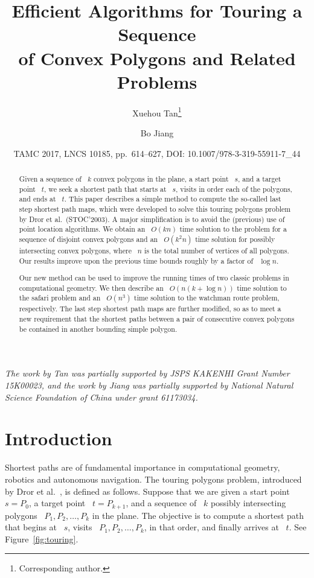 \documentclass[11pt]{article}
\title{Efficient Algorithms for Touring a Sequence\\ of Convex Polygons and Related Problems}
\author[2]{Xuehou Tan\thanks{Corresponding author.}}
\author[1]{Bo Jiang}
\affil[1]{Dalian Maritime University, Linghai Road 1, Dalian, China}
\affil[2]{Tokai University, 4-1-1 Kitakaname, Hiratsuka 259-1292, Japan \\ \texttt{tan@wing.ncc.u-tokai.ac.jp}}
\date{TAMC 2017, LNCS 10185, pp.\ 614--627, DOI: 10.1007/978-3-319-55911-7\_44}
\begin{document}
\maketitle

\begin{abstract}
Given a sequence of ~\(k\) convex polygons in the plane, a start point ~\(s\), and a target point ~\(t\), we seek a shortest path that starts at ~\(s\), visits in order each of the polygons, and ends at ~\(t\).
This paper describes a simple method to compute the so-called last step shortest path maps, which were developed to solve this touring polygons problem by Dror et al.\ (STOC'2003).
A major simplification is to avoid the (previous) use of point location algorithms.
We obtain an ~\(O(kn)\) time solution to the problem for a sequence of disjoint convex polygons and an ~\(O(k^2n)\) time solution for possibly intersecting convex polygons, where ~\(n\) is the total number of vertices of all polygons.
Our results improve upon the previous time bounds roughly by a factor of ~\(\log n\).

Our new method can be used to improve the running times of two classic problems in computational geometry.
We then describe an ~\(O(n(k+\log n))\) time solution to the safari problem and an ~\(O(n^3)\) time solution to the watchman route problem, respectively.
The last step shortest path maps are further modified, so as to meet a new requirement that the shortest paths between a pair of consecutive convex polygons be contained in another bounding simple polygon.
\end{abstract}

\noindent \emph{The work by Tan was partially supported by JSPS KAKENHI Grant Number 15K00023, and the work by Jiang was partially supported by National Natural Science Foundation of China under grant 61173034.}

\section{Introduction}

Shortest paths are of fundamental importance in computational geometry, robotics and autonomous navigation.
The touring polygons problem, introduced by Dror et al.~\cite{ref6}, is defined as follows.
Suppose that we are given a start point ~\(s = P_0\), a target point ~\(t = P_{k+1}\), and a sequence of ~\(k\) possibly intersecting polygons ~\(P_1, P_2, \ldots, P_k\) in the plane.
The objective is to compute a shortest path that begins at ~\(s\), visits ~\(P_1, P_2, \ldots, P_k\), in that order, and finally arrives at ~\(t\).
See Figure~\ref{fig:touring}.
\end{document}
